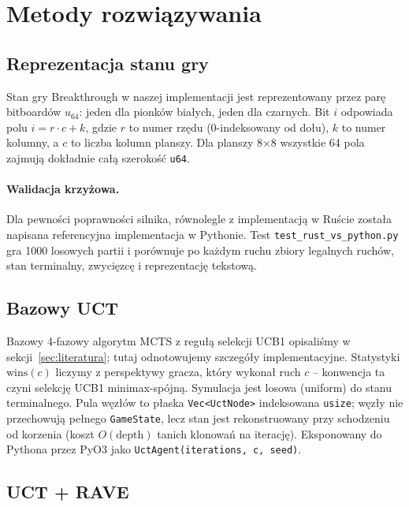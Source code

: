 \section{Metody rozwiązywania}
\label{sec:metoda}

\subsection{Reprezentacja stanu gry}

Stan gry Breakthrough w naszej implementacji jest reprezentowany przez parę
bitboardów $u_{64}$: jeden dla pionków białych, jeden dla czarnych. Bit $i$
odpowiada polu $i = r \cdot c + k$, gdzie $r$ to numer rzędu (0-indeksowany
od dołu), $k$ to numer kolumny, a $c$ to liczba kolumn planszy. Dla planszy
8$\times$8 wszystkie 64 pola zajmują dokładnie całą szerokość \texttt{u64}.

\paragraph{Walidacja krzyżowa.}
Dla pewności poprawności silnika, równolegle z implementacją w Ruście została
napisana referencyjna implementacja w Pythonie.
Test \texttt{test\_rust\_vs\_python.py} gra 1000 losowych partii i porównuje
po każdym ruchu zbiory legalnych ruchów, stan terminalny, zwycięzcę i
reprezentację tekstową.

\subsection{Bazowy UCT}

Bazowy 4-fazowy algorytm MCTS z regułą selekcji UCB1 opisaliśmy
w sekcji~\ref{sec:literatura}; tutaj odnotowujemy szczegóły implementacyjne.
Statystyki $\text{wins}(c)$ liczymy z perspektywy gracza, który wykonał ruch
$c$ -- konwencja ta czyni selekcję UCB1 minimax-spójną. Symulacja jest losowa
(uniform) do stanu terminalnego. Pula węzłów to płaska \texttt{Vec<UctNode>}
indeksowana \texttt{usize}; węzły nie przechowują pełnego \texttt{GameState},
lecz stan jest rekonstruowany przy schodzeniu od korzenia (koszt
$O(\text{depth})$ tanich klonowań na iterację). Eksponowany do Pythona przez
PyO3 jako \texttt{UctAgent(iterations, c, seed)}.

\subsection{UCT + RAVE}

